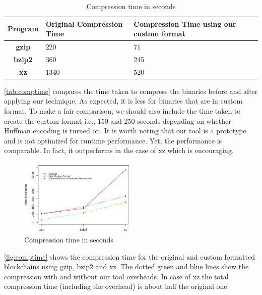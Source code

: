 \begin{table}[H]
	\centering
	\begin{tabular}{>{\bfseries}c | p{3cm} | p{3cm}} 
	Program & {Original Compression Time} & {Compression Time using our custom format} \\
	\hline
	gzip & 220  & 71 \\
	bzip2 & 360  & 245\\
	xz & 1340 & 520 \\
	\end{tabular}
	\caption{Compression time in seconds}
	\label{tab:comptime}
\end{table}
\autoref{tab:comptime} compares the time taken to compress the binaries before and after applying our technique. As expected, it is less for binaries that are in custom format. 
To make a fair comparison, we should also include the time taken to create the custom format i.e., 150 and 250 seconds depending on whether Huffman encoding is turned on.
It is worth noting that our tool is a prototype and is not optimized for runtime performance. 
Yet, the performance is comparable. 
In fact, it outperforms in the case of xz which is encouraging.
\begin{figure}[H]
	\centering
	\includegraphics[width=0.5\textwidth, scale=0.5]{plots/time}
	\caption{Compression time in seconds}
	\label{fig:comptime}
\end{figure}
\autoref{fig:comptime} shows the compression time for the original and custom formatted blockchains using gzip, bzip2 and xz.
The dotted green and blue lines show the compression with and without our tool
overheads. In case of xz the total compression time (including the overhead) is about half the original one.

